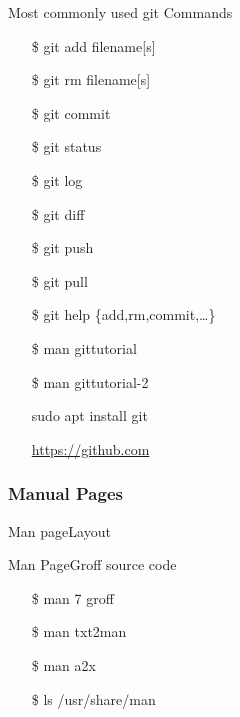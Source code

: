 \begin{frame}
  \begin{block}{Most commonly used git Commands}\ttfamily
    \begin{itemize}
    \item[\$] git add filename[s]
    \item[\$] git rm filename[s]
    \item[\$] git commit
    \item[\$] git status
    \item[\$] git log
    \item[\$] git diff
    \item[\$] git push
    \item[\$] git pull
    \item[\$] git help \{add,rm,commit,\ldots\}
    \end{itemize}
  \end{block}
  \begin{multicols}{2}
    \begin{itemize}
    \item[\$] man gittutorial
    \item[\$] man gittutorial-2
    \item[\debian] sudo apt install git
    \item[\github] \url{https://github.com}
    \end{itemize}
  \end{multicols}
\end{frame}

\subsubsection{Manual Pages}
\label{sec:manual-pages}

\begin{frame}{Man page}{Layout}
  \begin{center}
  \end{center}
\end{frame}

\begin{frame}{Man Page}{Groff source code}
  \begin{minipage}[b]{.6\linewidth}
    \begin{center}
    \end{center}
  \end{minipage}
  \begin{minipage}[b]{.35\linewidth}\ttfamily
    \begin{itemize}
    \item[\$] man 7 groff
    \item[\$] man txt2man
    \item[\$] man a2x
    \item[\$] ls /usr/share/man
    \end{itemize}
  \end{minipage}
\end{frame}

